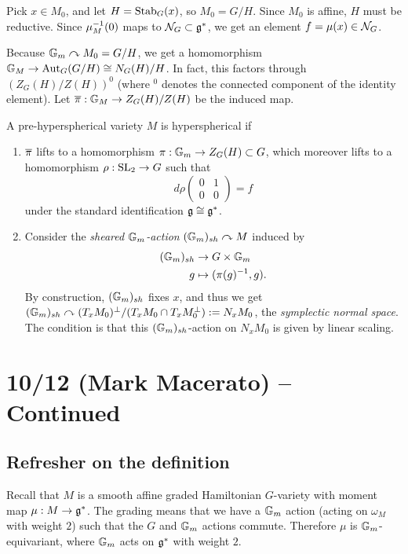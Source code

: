 \documentclass{article}
\begin{document}
Pick $x \in M_0$, and let $H = \operatorname{Stab}_G(x)$, so $M_0 = G / H$.
Since $M_0$ is affine, $H$ must be reductive.
Since $\mu_M^{-1}(0)$ maps to $\mathcal{N}_G \subset \mathfrak{g}^*$, we get an element $f = \mu(x) \in \mathcal{N}_G$.

Because $\mathbb{G}_m \curvearrowright M_0 = G / H$, we get a homomorphism $\mathbb{G}_M \to \operatorname{Aut}_G(G / H) \cong N_G(H) / H$.
In fact, this factors through $(Z_G(H) / Z(H))^0$ (where ${}^0$ denotes the connected component of the identity element).
Let $\overline{\pi}: \mathbb{G}_M \to Z_G(H) / Z(H)$ be the induced map.

\begin{dfn}
	A pre-hyperspherical variety $M$ is hyperspherical if
	\begin{enumerate}
		\item $\overline{\pi}$ lifts to a homomorphism $\pi: \mathbb{G}_m \to Z_G(H) \subset G$, which moreover lifts to a homomorphism $\rho: \operatorname{SL}_2 \to G$ such that
			\[
				d\rho \begin{pmatrix}
					0 & 1 \\
					0 & 0
				\end{pmatrix} = f
			\]
			under the standard identification $\mathfrak{g} \cong \mathfrak{g}^*$.
		\item Consider the \emph{sheared $\mathbb{G}_m$-action} $(\mathbb{G}_m)_{sh} \curvearrowright M$ induced by
			\begin{align*}
				(\mathbb{G}_m)_{sh} &\to G \times \mathbb{G}_m \\
				g &\mapsto (\pi(g)^{-1}, g).
			\end{align*}
			By construction, $(\mathbb{G}_m)_{sh}$ fixes $x$, and thus we get $(\mathbb{G}_m)_{sh} \curvearrowright (T_x M_0)^\perp / (T_x M_0 \cap T_x M_0^\perp) := N_x M_0$, the \emph{symplectic normal space}.
			The condition is that this $(\mathbb{G}_m)_{sh}$-action on $N_x M_0$ is given by linear scaling.
	\end{enumerate}
\end{dfn}

\section{10/12 (Mark Macerato) -- Continued}

\subsection{Refresher on the definition}

Recall that $M$ is a smooth affine graded Hamiltonian $G$-variety with moment map $\mu: M \to \mathfrak{g}^*$.
The grading means that we have a $\mathbb{G}_m$ action (acting on $\omega_M$ with weight $2$) such that the $G$ and $\mathbb{G}_m$ actions commute.
Therefore $\mu$ is $\mathbb{G}_m$-equivariant, where $\mathbb{G}_m$ acts on $\mathfrak{g}^*$ with weight $2$.
\end{document}

